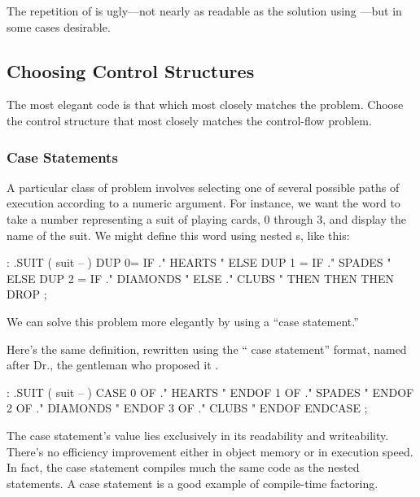 The repetition of  is ugly---not nearly as readable as the
solution using ---but in some cases desirable.%
%
%

\subsection{Choosing Control Structures}%
\begin{tip}
The most elegant code is that which most closely matches the problem.
Choose the control structure that most closely matches the control-flow
problem.
\end{tip}%

\subsubsection{Case Statements}%
%

A particular class of problem involves selecting one of several possible
paths of execution according to a numeric argument. For instance, we
want the word  to take a number representing a suit of playing
cards, 0 through 3, and display the name of the suit. We might define this
word using nested s, like this:

\begin{Code}
: .SUIT ( suit -- )
  DUP  0=  IF ." HEARTS "   ELSE
  DUP  1 = IF ." SPADES "   ELSE
  DUP  2 = IF ." DIAMONDS " ELSE
              ." CLUBS "
  THEN THEN THEN  DROP ;
\end{Code}
We can solve this problem more elegantly by using a ``case statement.''

Here's the same definition, rewritten using the `` case
statement'' format, named after Dr.\@ {}, the
gentleman who proposed it \cite{eaker}.

\begin{Code}
: .SUIT ( suit -- )
  CASE
  0 OF   ." HEARTS "    ENDOF
  1 OF   ." SPADES "    ENDOF
  2 OF   ." DIAMONDS "  ENDOF
  3 OF   ." CLUBS "     ENDOF     ENDCASE ;
\end{Code}
The case statement's value lies exclusively in its readability and
writeability. There's no efficiency improvement either in object memory or
in execution speed. In fact, the case statement compiles much the same
code as the nested  statements. A case statement
is a good example of compile-time factoring.

